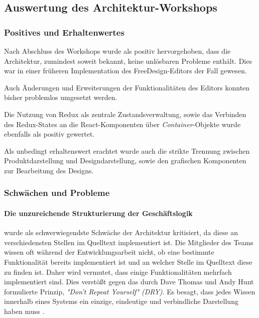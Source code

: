 \subsection{Auswertung des Architektur-Workshops}

\subsubsection{Positives und Erhaltenwertes}
Nach Abschluss des Workshops wurde als positiv hervorgehoben, dass die Architektur, zumindest soweit bekannt, keine unlösbaren Probleme enthält. 
Dies war in einer früheren Implementation des FreeDesign-Editors der Fall gewesen.

Auch Änderungen und Erweiterungen der Funktionalitäten des Editors konnten bisher problemlos umgesetzt werden.

Die Nutzung von Redux als zentrale Zustandsverwaltung, sowie das Verbinden des Redux-States an die React-Komponenten über \emph{Container}-Objekte wurde ebenfalls als positiv gewertet. 

Als unbedingt erhaltenswert erachtet wurde auch die strikte Trennung zwischen Produktdarstellung und Designdarstellung, sowie den grafischen Komponenten zur Bearbeitung des Designs. 


\subsubsection{Schwächen und Probleme}
\paragraph{Die unzureichende Strukturierung der Geschäftslogik}
wurde als schwerwiegendste Schwäche der Architektur kritisiert, da 
diese an verschiedensten Stellen im Quelltext implementiert ist. Die Mitglieder des Teams wissen oft während der Entwicklungsarbeit nicht, ob eine bestimmte Funktionalität bereits implementiert ist und an welcher Stelle im Quelltext diese zu finden ist. 
Daher wird vermutet, dass einige Funktionalitäten mehrfach implementiert sind. 
Dies verstößt gegen das durch Dave Thomas und Andy Hunt formulierte Prinzip, \emph{"Don’t Repeat Yourself" (DRY)}. Es besagt, dass jedes Wissen innerhalb eines Systems ein einzige, eindeutige und verbindliche Darstellung haben muss \autocite[vgl.][30 - 31]{ThomasAndHunt2020}. 

